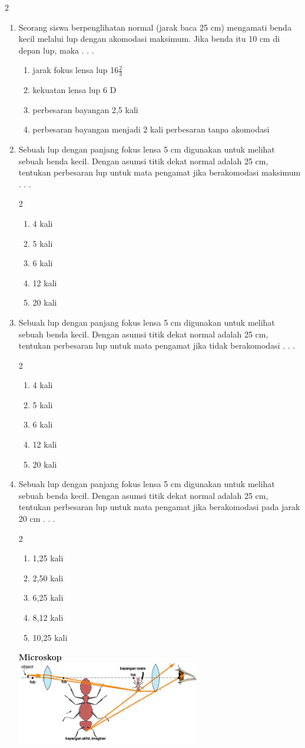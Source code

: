 \documentclass[10pt,a4paper]{extarticle}
\newcommand*\pernyataan[1]{
\begin{enumerate}[label=(\arabic*), itemsep=0pt,topsep=0pt,leftmargin=*] #1 
\end{enumerate}}
\newcommand{\pilgani}[1]{                            \vspace{-0.3cm}\begin{multicols}{2}
 \begin{enumerate}[label=\Alph*., itemsep=0pt,topsep=0pt,leftmargin=*,align=Center]#1                     \end{enumerate}
 \phantom{ini cuma sapi, wedus, dan ayam}
 \end{multicols}}
\begin{document}
\begin{multicols*}{2}
\begin{enumerate}
\item Seorang siswa berpenglihatan normal (jarak baca 25 cm) mengamati benda kecil melalui lup dengan akomodasi maksimum. Jika benda itu 10 cm di depan lup, maka . . .
\pernyataan{
	\item jarak fokus lensa lup 16$\frac{2}{3}$
	\item kekuatan lensa lup 6 D
	\item perbesaran bayangan 2,5 kali
	\item perbesaran bayangan menjadi 2 kali perbesaran tanpa akomodasi
}
\vspace{2cm}

\item Sebuah lup dengan panjang fokus lensa 5 cm digunakan untuk melihat sebuah benda kecil. Dengan asumsi titik dekat normal adalah 25 cm, tentukan perbesaran lup untuk mata pengamat jika berakomodasi maksimum . . .
\pilgani{
	\item 4 kali
	\item 5 kali
	\item 6 kali
	\item 12 kali
	\item 20 kali }
\vspace{2cm}

\item Sebuah lup dengan panjang fokus lensa 5 cm digunakan untuk melihat sebuah benda kecil. Dengan asumsi titik dekat normal adalah 25 cm, tentukan perbesaran lup untuk mata pengamat jika tidak berakomodasi . . .
\pilgani{
	\item 4 kali
	\item 5 kali
	\item 6 kali
	\item 12 kali
	\item 20 kali }
\vspace{2cm}

\item Sebuah lup dengan panjang fokus lensa 5 cm digunakan untuk melihat sebuah benda kecil. Dengan asumsi titik dekat normal adalah 25 cm, tentukan perbesaran lup untuk mata pengamat jika berakomodasi pada jarak 20 cm . . .
\pilgani{
	\item 1,25 kali
	\item 2,50 kali
	\item 6,25 kali
	\item 8,12 kali
	\item 10,25 kali }
\vspace{2cm}

\textbf{Microskop}\\
\includegraphics[width=8cm]{pic/mikroskop}


\end{enumerate}
\end{multicols*}
\end{document}
